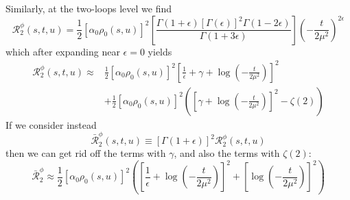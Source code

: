 Similarly, at the two-loops level we find
\begin{equation}
	\mathcal{R}_{2}^{\phi}(s, t, u) = \frac{1}{2} \left[ \alpha_{0} \rho_{0}(s, u) \right]^{2} \left[ \frac{\Gamma(1 + \epsilon) [\Gamma(\epsilon)]^{2} \Gamma(1 - 2\epsilon)}{\Gamma(1 + 3 \epsilon)} \right] \left( -\frac{t}{2 \mu^{2}} \right)^{2\epsilon}
\end{equation}
which after expanding near $\epsilon = 0$ yields
\begin{align}
	\mathcal{R}_{2}^{\phi}(s, t, u) \approx {}&\frac{1}{2} \left[ \alpha_{0} \rho_{0}(s, u) \right]^{2} \left[ \frac{1}{\epsilon} + \gamma + \log{\left( -\frac{t}{2 \mu^{2}} \right)} \right]^{2} \nonumber \\
	&+ \frac{1}{2} \left[ \alpha_{0} \rho_{0}(s, u) \right]^{2} \left( \left[ \gamma + \log{\left( -\frac{t}{2 \mu^{2}} \right)} \right]^{2} - \zeta(2) \right) \label{2Loop4D}
\end{align}
If we consider instead
\begin{equation}
	\bar{\mathcal{R}}_{2}^{\phi}(s, t, u) \equiv [\Gamma(1 + \epsilon)]^{2} \mathcal{R}_{2}^{\phi}(s, t, u)
\end{equation}
then we can get rid off the terms with $\gamma$, and also the terms with $\zeta(2)$:
\begin{equation}
	\bar{\mathcal{R}}_{2}^{\phi} \approx \frac{1}{2} \left[ \alpha_{0} \rho_{0}(s, u) \right]^{2} \left( \left[ \frac{1}{\epsilon} + \log{\left( -\frac{t}{2 \mu^{2}} \right)} \right]^{2} + \left[ \log{\left( -\frac{t}{2 \mu^{2}} \right)} \right]^{2} \right)
\end{equation}

